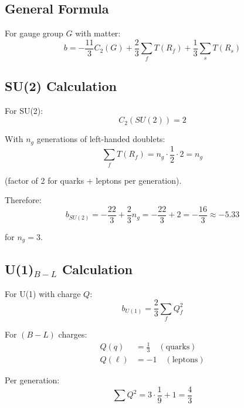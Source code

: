 \documentclass[11pt,a4paper]{article}
\begin{document}
\subsection{General Formula}
\label{app:beta-general}

For gauge group $G$ with matter:
\begin{equation}
\label{eq:beta-formula}
b = -\frac{11}{3} C_2(G) + \frac{2}{3} \sum_f T(R_f) + \frac{1}{3} \sum_s T(R_s)
\end{equation}

\subsection{SU(2) Calculation}
\label{app:su2-calc}

For SU(2):
\begin{equation}
\label{eq:c2-su2}
C_2(SU(2)) = 2
\end{equation}

With $n_g$ generations of left-handed doublets:
\begin{equation}
\label{eq:tf-su2}
\sum_f T(R_f) = n_g \cdot \frac{1}{2} \cdot 2 = n_g
\end{equation}

(factor of 2 for quarks + leptons per generation).

Therefore:
\begin{equation}
\label{eq:b-su2-final}
b_{SU(2)} = -\frac{22}{3} + \frac{2}{3} n_g = -\frac{22}{3} + 2 = -\frac{16}{3} \approx -5.33
\end{equation}

for $n_g = 3$.

\subsection{U(1)$_{B-L}$ Calculation}
\label{app:u1-calc}

For U(1) with charge $Q$:
\begin{equation}
\label{eq:b-u1-formula}
b_{U(1)} = \frac{2}{3} \sum_f Q_f^2
\end{equation}

For $(B-L)$ charges:
\begin{align}
\label{eq:bl-charges}
Q(q) &= \frac{1}{3} \quad (\text{quarks}) \\
Q(\ell) &= -1 \quad (\text{leptons})
\end{align}

Per generation:
\begin{equation}
\label{eq:bl-sum}
\sum Q^2 = 3 \cdot \frac{1}{9} + 1 = \frac{4}{3}
\end{equation}
\end{document}
